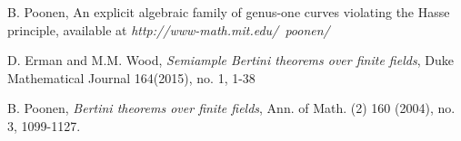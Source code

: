 \documentclass[12pt]{article}
\theoremstyle{plain}
\theoremstyle{definition}
\newcommand{\<}{\langle}
\renewcommand{\>}{\rangle}
\begin{document}
\begin{thebibliography}{9}
B. Poonen, An explicit algebraic family of genus-one curves violating the Hasse principle, available at \textit{http://www-math.mit.edu/~poonen/}

D. Erman and M.M. Wood, \textit{Semiample Bertini theorems over finite fields}, Duke Mathematical Journal 164(2015), no. 1, 1-38

B. Poonen, \textit{Bertini theorems over finite fields}, Ann. of Math. (2) 160 (2004), no. 3, 1099-1127.



\end{thebibliography}
                                                                                                                                                                                                                                                                                                                                                                                                                                                                                                                                                                                                                                                                                                                                                                                                                                                                                                                                                                                                                                                                                                                                                                                                                                                                                                                                                                                                                                                                                                                                                                                                                                                                                                                                                                                                                                                                                                                                                                                                                                                                                                                                                                                                                                                                                                                                                                                                                                                                                                                                                                                                                                                                                                                
\end{document}
